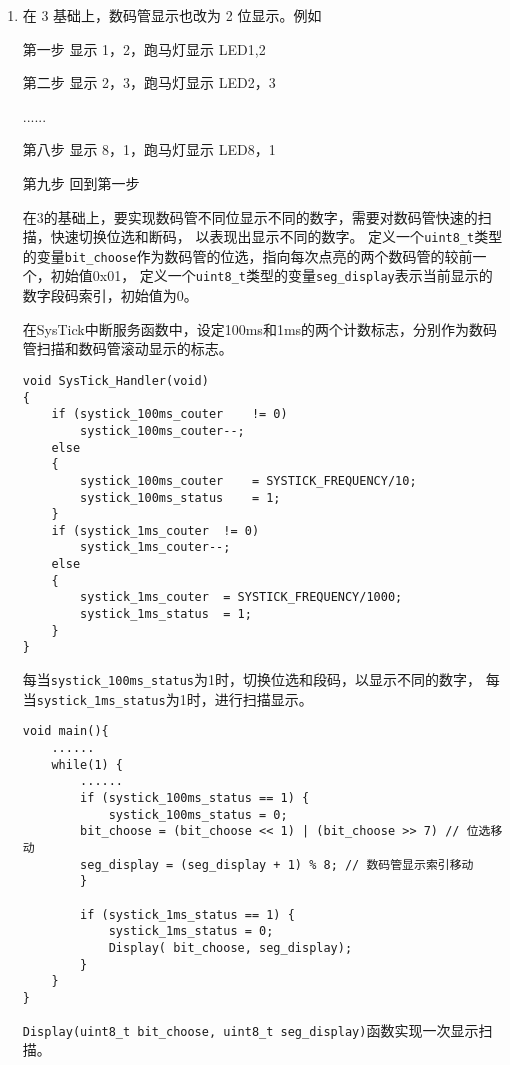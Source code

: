 \documentclass[12pt, a4paper, oneside]{ctexart}
\begin{document}
\begin{enumerate}[listparindent=2em]
        {这样每次位选两个数码管并且移动，实现2位跑马。}

        \item 在 3 基础上，数码管显示也改为 2 位显示。例如
        
        第一步 显示 1，2，跑马灯显示 LED1,2
        
        第二步 显示 2，3，跑马灯显示 LED2，3
        
        ......
        
        第八步 显示 8，1，跑马灯显示 LED8，1
        
        第九步 回到第一步

        {\kaishu 在3的基础上，要实现数码管不同位显示不同的数字，需要对数码管快速的扫描，快速切换位选和断码，
        以表现出显示不同的数字。
        定义一个\verb|uint8_t|类型的变量\verb|bit_choose|作为数码管的位选，指向每次点亮的两个数码管的较前一个，初始值0x01，
        定义一个\verb|uint8_t|类型的变量\verb|seg_display|表示当前显示的数字段码索引，初始值为0。

        在SysTick中断服务函数中，设定100ms和1ms的两个计数标志，分别作为数码管扫描和数码管滚动显示的标志。}
        
        \begin{lstlisting}
void SysTick_Handler(void)
{
    if (systick_100ms_couter	!= 0)
	    systick_100ms_couter--;
    else
    {
	    systick_100ms_couter	= SYSTICK_FREQUENCY/10;
	    systick_100ms_status 	= 1;
    }
    if (systick_1ms_couter	!= 0)
        systick_1ms_couter--;
    else
    {
        systick_1ms_couter	= SYSTICK_FREQUENCY/1000;
        systick_1ms_status 	= 1;
    }
}   
        \end{lstlisting}

        {\kaishu 每当\verb|systick_100ms_status|为1时，切换位选和段码，以显示不同的数字，
        每当\verb|systick_1ms_status|为1时，进行扫描显示。} 
        \begin{lstlisting}
void main(){
    ...... 
    while(1) {
        ...... 
        if (systick_100ms_status == 1) {
            systick_100ms_status = 0;
        bit_choose = (bit_choose << 1) | (bit_choose >> 7) // 位选移动
        seg_display = (seg_display + 1) % 8; // 数码管显示索引移动
        }

        if (systick_1ms_status == 1) {
            systick_1ms_status = 0;
            Display( bit_choose, seg_display); 
        }
    }
}
        \end{lstlisting}

    {\kaishu \verb|Display(uint8_t bit_choose, uint8_t seg_display)|函数实现一次显示扫描。}


\end{enumerate}
\end{document}
